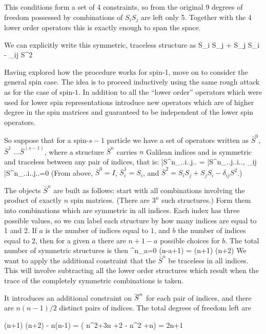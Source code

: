 This conditions form a set of 4 constraints, so from the original 9 degrees of freedom possessed by combinations of $S_i S_j$ are left only 5.  Together with the 4 lower order operators this is exactly enough to span the space.

We can explicitly write this symmetric, traceless structure as
\beq
	 S_i S_j + S_j S_i - \delta_{ij} S^2
\eeq

Having explored how the procedure works for spin-1, move on to consider the general spin case.   The idea is to proceed inductively using the same rough attack as for the case of spin-$1$.  In addition to all the ``lower order'' operators which were used for lower spin representations introduce new operators which are of higher degree in the spin matrices and guaranteed to be independent of the lower spin operators.

So suppose that for a spin-$s-1$ particle we have a set of operators written as $\bar{S}^0$, $\bar{S}^1$ $\ldots \bar{S}^{(s-1)}$, where a structure $\bar{S}^n$ carries $n$ Galilean indices and is symmetric and traceless between any pair of indices, that is:
\beq
	\bar{S}^n_{..i..j..} = \bar{S}^n_{..j..i..}, \; \delta_{ij} \bar{S}^n_{..i..j..}=0
\eeq 
(From above, $\bar{S}^0=I$, $\bar{S}^1_i = S_i$, and $\bar{S}^2 = S_i S_j + S_j S_i - \delta_{ij} S^2$.) 

The objects $\bar{S}^n$ are built as follows: start with all combinations involving the product of exactly $n$ spin matrices.  (There are $3^n$ such structures.)  Form them into combinations which are symmetric in all indices.  Each index has three possible values, so we can label each structure by how many indices are equal to 1 and 2.  If $a$ is the number of indices equal to $1$, and $b$ the number of indices equal to $2$, then for a given $a$ there are $n+1-a$ possible choices for $b$.  The total number of symmetric structures is then
\beq
	\sum^n_{a=0} (n-a+1) =  (n+1) (n+2)
\eeq
We want to apply the additional constraint that the $\bar{S}^n$ be traceless in all indices.  This will involve subtracting all the lower order structures which result when the trace of the completely symmetric combinations is taken.  %

It introduces an additional constraint on $\overline{S}^n$ for each pair of indices, and there are $n (n-1)/2$ distinct pairs of indices.  The total degrees of freedom left are

\beq
	 (n+1) (n+2) -  n(n-1) 
		= \left( n^2+3n +2 - n^2 +n\right )
		= 2n+1
\eeq

